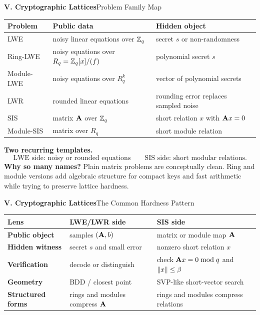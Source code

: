 \begin{frame}[shrink=8]{\textbf{V. Cryptographic Lattices}}{Problem Family Map}
\begin{center}
\renewcommand{\arraystretch}{1.22}
\begin{tabular}{p{}p{}p{}}
\toprule
Problem & Public data & Hidden object \\
\midrule
LWE & noisy linear equations over $\mathbb{Z}_q$ & secret $s$ or non-randomness \\
Ring-LWE & noisy equations over $R_q=\mathbb{Z}_q[x]/(f)$ & polynomial secret $s$ \\
Module-LWE & noisy equations over $R_q^k$ & vector of polynomial secrets \\
LWR & rounded linear equations & rounding error replaces sampled noise \\
SIS & matrix $\mathbf{A}$ over $\mathbb{Z}_q$ & short relation $x$ with $\mathbf{A} x=0$ \\
Module-SIS & matrix over $R_q$ & short module relation \\
\bottomrule
\end{tabular}
\end{center}
\vspace{-.1cm}
\textbf{Two recurring templates.}
\[
  \text{LWE side: noisy or rounded equations}
  \qquad
  \text{SIS side: short modular relations.}
\]
\textbf{Why so many names?}\; Plain matrix problems are conceptually clean.
Ring and module versions add algebraic structure for compact keys and fast arithmetic while trying to preserve lattice hardness.
\end{frame}

\begin{frame}[shrink=6]{\textbf{V. Cryptographic Lattices}}{The Common Hardness Pattern}
\small
\begin{center}
\renewcommand{\arraystretch}{1.20}
\begin{tabular}{>{\bfseries}p{}p{}p{}}
\toprule
Lens & LWE/LWR side & SIS side \\
\midrule
Public object & samples $(\mathbf{A},b)$ & matrix or module map $\mathbf{A}$ \\
Hidden witness & secret $s$ and small error & nonzero short relation $x$ \\
Verification & decode or distinguish & check $\mathbf{A} x=0\bmod q$ and $\left\lVert x\right\rVert\le\beta$ \\
Geometry & BDD / closest point & SVP-like short-vector search \\
Structured forms & rings and modules compress $\mathbf{A}$ & rings and modules compress relations \\
\bottomrule
\end{tabular}
\end{center}
\vspace{-.1cm}
\end{frame}

